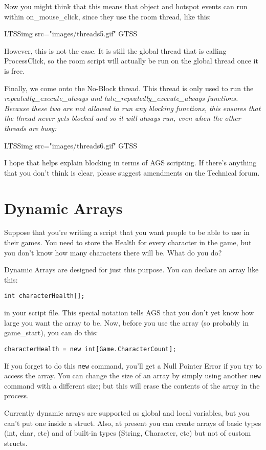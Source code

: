 Now you might think that this means that object and hotspot events can run within
on_mouse_click, since they use the room thread, like this:

LTSSimg src="images/threads5.gif" GTSS

However, this is not the case. It is still the global thread that is calling ProcessClick,
so the room script will actually be run on the global thread once it is free.

Finally, we come onto the No-Block thread. This thread is only used to run the
\it{repeatedly_execute_always} and \it{late_repeatedly_execute_always} functions. Because these two are not
allowed to run any blocking functions, this ensures that the thread never gets blocked
and so it will always run, even when the other threads are busy:

LTSSimg src="images/threads6.gif" GTSS

I hope that helps explain blocking in terms of AGS scripting. If there's anything that
you don't think is clear, please suggest amendments on the Technical forum.


\section{Dynamic Arrays}\label{DynamicArrays}%

Suppose that you're writing a script that you want people to be able
to use in their games. You need to store the Health for every character
in the game, but you don't know how many characters there will be. What do you do?

Dynamic Arrays are designed for just this purpose. You can declare an array like this:

\verb$int characterHealth[];$

in your script file. This special notation tells AGS that you don't yet know how large
you want the array to be. Now, before you use the array (so probably in game_start),
you can do this:

\verb$characterHealth = new int[Game.CharacterCount];$

If you forget to do this \verb$new$ command, you'll get a Null Pointer Error if you try
to access the array. You can change the size of an array by simply using another
\verb$new$ command with a different size; but this will erase the contents of the
array in the process.

Currently dynamic arrays are supported as global and local variables, but
you can't put one inside a struct.
Also, at present you can create arrays of basic types (int, char, etc) and
of built-in types (String, Character, etc) but not of custom structs.


